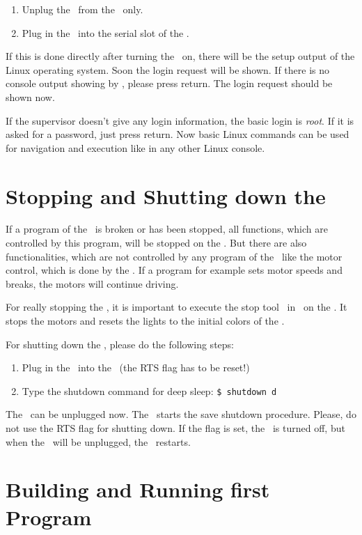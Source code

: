 \begin{enumerate}
\item Unplug the \progcable\ from the \diwheel\ only.
\item Plug in the \progcable\ into the serial slot of the \cognition.
\end{enumerate}

If this is done directly after turning the \amiro\ on, there will be the setup output of the Linux operating system. Soon the login request will be shown. If there is no console output showing by \gtk, please press return. The login request should be shown now.

If the supervisor doesn't give any login information, the basic login is {\it root}. If it is asked for a password, just press return. Now basic Linux commands can be used for navigation and execution like in any other Linux console.

\section{Stopping and Shutting down the \amiro}
\label{sec:stopshutdown}

If a program of the \cognition\ is broken or has been stopped, all functions, which are controlled by this program, will be stopped on the \cognition. But there are also functionalities, which are not controlled by any program of the \cognition\ like the motor control, which is done by the \diwheel. If a program for example sets motor speeds and breaks, the motors will continue driving.

For really stopping the \amiro, it is important to execute the stop tool \stopnameI\ in \stoppathI\ on the \cognition. It stops the motors and resets the lights to the initial colors of the \light.

For shutting down the \amiro, please do the following steps:
\begin{enumerate}
\item Plug in the \progcable\ into the \diwheel\ (the RTS flag has to be reset!)
\item Type the shutdown command for deep sleep: {\tt\$ shutdown d}
\end{enumerate}
The \progcable\ can be unplugged now. The \amiro\ starts the save shutdown procedure. Please, do not use the RTS flag for shutting down. If the flag is set, the \amiro\ is turned off, but when the \progcable\ will be unplugged, the \amiro\ restarts.

\section{Building and Running first Program}
\label{sec:firstprog}


